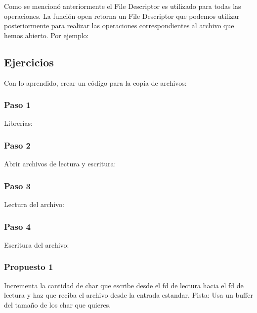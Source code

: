 \documentclass[journal]{IEEEtai}
\begin{document}


Como se mencionó anteriormente el File Descriptor es utilizado para todas las operaciones. La función open retorna un File Descriptor que podemos utilizar posteriormente para realizar las operaciones correspondientes al archivo que hemos abierto. Por ejemplo:






\subsection{Ejercicios}

Con lo aprendido, crear un código para la copia de archivos:

\subsubsection{Paso 1}

Librerías:



\subsubsection{Paso 2}

Abrir archivos de lectura y escritura:



\subsubsection{Paso 3}

Lectura del archivo:



\subsubsection{Paso 4}

Escritura del archivo:



\subsubsection{Propuesto 1} Incrementa la cantidad de char que escribe desde el fd de lectura hacia el fd de lectura y haz que reciba el archivo desde la entrada estandar. Pista: Usa un buffer del tamaño de los char que quieres.
\end{document}
